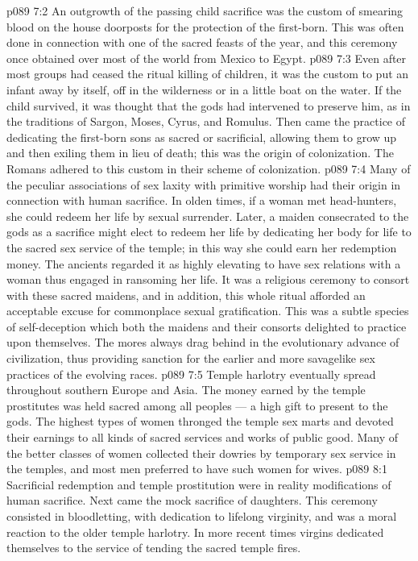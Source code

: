 \vs p089 7:2 An outgrowth of the passing child sacrifice was the custom of smearing blood on the house doorposts for the protection of the first\hyp{}born. This was often done in connection with one of the sacred feasts of the year, and this ceremony once obtained over most of the world from Mexico to Egypt.
\vs p089 7:3 Even after most groups had ceased the ritual killing of children, it was the custom to put an infant away by itself, off in the wilderness or in a little boat on the water. If the child survived, it was thought that the gods had intervened to preserve him, as in the traditions of Sargon, Moses, Cyrus, and Romulus. Then came the practice of dedicating the first\hyp{}born sons as sacred or sacrificial, allowing them to grow up and then exiling them in lieu of death; this was the origin of colonization. The Romans adhered to this custom in their scheme of colonization.
\vs p089 7:4 \pc Many of the peculiar associations of sex laxity with primitive worship had their origin in connection with human sacrifice. In olden times, if a woman met head\hyp{}hunters, she could redeem her life by sexual surrender. Later, a maiden consecrated to the gods as a sacrifice might elect to redeem her life by dedicating her body for life to the sacred sex service of the temple; in this way she could earn her redemption money. The ancients regarded it as highly elevating to have sex relations with a woman thus engaged in ransoming her life. It was a religious ceremony to consort with these sacred maidens, and in addition, this whole ritual afforded an acceptable excuse for commonplace sexual gratification. This was a subtle species of self\hyp{}deception which both the maidens and their consorts delighted to practice upon themselves. The mores always drag behind in the evolutionary advance of civilization, thus providing sanction for the earlier and more savagelike sex practices of the evolving races.
\vs p089 7:5 Temple harlotry eventually spread throughout southern Europe and Asia. The money earned by the temple prostitutes was held sacred among all peoples --- a high gift to present to the gods. The highest types of women thronged the temple sex marts and devoted their earnings to all kinds of sacred services and works of public good. Many of the better classes of women collected their dowries by temporary sex service in the temples, and most men preferred to have such women for wives.
\vs p089 8:1 Sacrificial redemption and temple prostitution were in reality modifications of human sacrifice. Next came the mock sacrifice of daughters. This ceremony consisted in bloodletting, with dedication to lifelong virginity, and was a moral reaction to the older temple harlotry. In more recent times virgins dedicated themselves to the service of tending the sacred temple fires.
